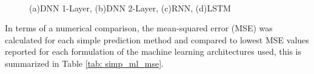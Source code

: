 \begin{figure}[h]
  \centering
  \quad
  \\
  \quad
  \caption{(a)DNN 1-Layer, (b)DNN 2-Layer, (c)RNN, (d)LSTM} \cite{ml_paper}
  \label{fig: machine}
\end{figure}

\noindent In terms of a numerical comparison, the mean-squared error (MSE) was calculated for each simple prediction method and compared to lowest MSE values reported for each formulation of the machine learning architectures used, this is summarized in Table \ref{tab: simp_ml_mse}. 

